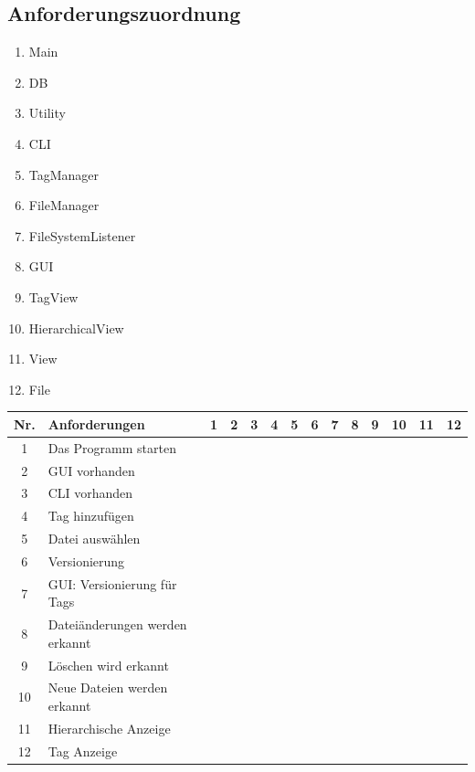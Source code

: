 \documentclass[10pt,paper=a4,final]{scrartcl}
\begin{document}
\subsection{Anforderungszuordnung}
\begin{enumerate}
  \item Main
  \item DB
  \item Utility
  \item CLI
  \item TagManager
  \item FileManager
  \item FileSystemListener
  \item GUI
  \item TagView
  \item HierarchicalView
  \item View
  \item File
\end{enumerate}
\begin{tabularx}{\textwidth}{|c|X|c|c|c|c|c|c|c|c|c|c|c|c|}
  \hline
  \bf Nr. & \bf Anforderungen &\bf 1 &\bf 2 &\bf 3 &\bf 4 &\bf 5 &\bf 6 &\bf 7 &\bf 8 &\bf 9 &\bf 10 &\bf 11 &\bf 12 \\ \hline
  1 & Das Programm starten & \cellcolor[gray]{0.7} & & & & & & & & & & & \\ \hline
  2 & GUI vorhanden & & & & & & & & \cellcolor[gray]{0.7} &\cellcolor[gray]{0.7} &\cellcolor[gray]{0.7} &\cellcolor[gray]{0.7} & \\ \hline
  3 & CLI vorhanden & & & &\cellcolor[gray]{0.7} & & & & & & & & \\ \hline
  4 & Tag hinzuf\"ugen & & & &\cellcolor[gray]{0.7} &\cellcolor[gray]{0.7} & & & &\cellcolor[gray]{0.7} & & & \\ \hline
  5 & Datei ausw\"ahlen & & & & & & \cellcolor[gray]{0.7} & & & & & & \cellcolor[gray]{0.7} \\ \hline
  6 & Versionierung & & \cellcolor[gray]{0.7} & & & & \cellcolor[gray]{0.7} & \cellcolor[gray]{0.7} & & & & & \cellcolor[gray]{0.7} \\ \hline
  7 & GUI: Versionierung f\"ur Tags & & & & & & & & \cellcolor[gray]{0.7} & & & & \\ \hline
  8 & Datei\"anderungen werden erkannt & & & & & & & & \cellcolor[gray]{0.7} & & & & \\ \hline
  9 & L\"oschen wird erkannt & & & & & & & & \cellcolor[gray]{0.7} & & & & \\ \hline
  10 & Neue Dateien werden erkannt & & & & & & & & \cellcolor[gray]{0.7} & & & & \\ \hline
  11 & Hierarchische Anzeige & & & & & & & & & & & \cellcolor[gray]{0.7} & \\ \hline
  12 & Tag Anzeige & & & & & & & & & \cellcolor[gray]{0.7} & & & \\ \hline
\end{tabularx}
\end{document}
